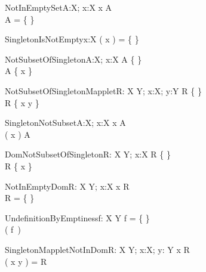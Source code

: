 \begin{theorem}{NotInEmptySet}{A:\power X; x:X}
x \in A \\
A = \{ \}
\end{theorem}

\begin{theorem}{SingletonIsNotEmpty}{x:X}
\se( x ) = \{ \}
\end{theorem}

\begin{theorem}{NotSubsetOfSingleton}{A:\power X; x:X}
A \neq \{ \} \\
A \subset \{ x \} 
\end{theorem}

\begin{theorem}{NotSubsetOfSingletonMapplet}{R: X \rel Y; x:X; y:Y}
R \neq \{ \} \\
\dom R \subset \dom \{ x \mapsto y \} 
\end{theorem}

\begin{theorem}{SingletonNotSubset}{A:\power X; x:X}
x \notin A \\
\se( x ) \subset A
\end{theorem}

\begin{theorem}{DomNotSubsetOfSingleton}{R: X \rel Y; x:X}
R \neq \{ \} \\
\dom R \subset \{ x \} 
\end{theorem}

\begin{theorem}{NotInEmptyDom}{R: X \rel Y; x:X}
x \in \dom R \\
R = \{ \}
\end{theorem}




\begin{theorem}{UndefinitionByEmptiness}{f: X \pfun Y}
f = \{ \} \\
\sw( f~\anything ) \\
\end{theorem}

\begin{theorem}{SingletonMappletNotInDom}{R: X \rel Y; x:X; y: Y}
x \notin \dom R \\
\dom \se( x \mapsto y ) = \dom R
\end{theorem}

